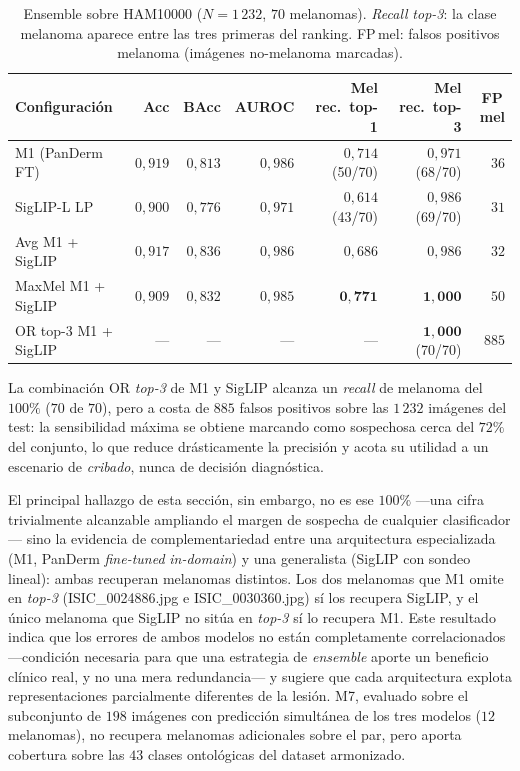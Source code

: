 \begin{table}[H]
\centering
\footnotesize
\setlength{\tabcolsep}{4pt}
\renewcommand{\arraystretch}{0.95}
\caption{Ensemble sobre HAM10000 ($N = 1\,232$, $70$ melanomas).
\emph{Recall} \emph{top-3}: la clase melanoma aparece entre las
tres primeras del ranking. FP\,mel: falsos positivos melanoma
(imágenes no-melanoma marcadas).}
\label{tab:ensemble}
\begin{tabular}{lrrrrrr}
\hline
Configuración                   & Acc           & BAcc          & AUROC         & Mel rec.\ top-1 & Mel rec.\ top-3 & FP\,mel \\
\hline
M1 (PanDerm FT)                 & $0{,}919$     & $0{,}813$     & $0{,}986$     & $0{,}714$ (50/70) & $0{,}971$ (68/70) & $36$ \\
SigLIP-L LP                     & $0{,}900$     & $0{,}776$     & $0{,}971$     & $0{,}614$ (43/70) & $0{,}986$ (69/70) & $31$ \\
Avg M1 + SigLIP                 & $0{,}917$     & $0{,}836$     & $0{,}986$     & $0{,}686$         & $0{,}986$         & $32$ \\
MaxMel M1 + SigLIP              & $0{,}909$     & $0{,}832$     & $0{,}985$     & $\mathbf{0{,}771}$ & $\mathbf{1{,}000}$ & $50$ \\
OR top-3 M1 + SigLIP            & ---           & ---           & ---           & ---               & $\mathbf{1{,}000}$ (70/70) & $885$ \\
\hline
\end{tabular}
\end{table}

La combinación OR \emph{top-3} de M1 y SigLIP alcanza un
\emph{recall} de melanoma del $100\%$ ($70$ de $70$), pero a costa
de $885$ falsos positivos sobre las $1\,232$ imágenes del test: la
sensibilidad máxima se obtiene marcando como sospechosa cerca del
$72\%$ del conjunto, lo que reduce drásticamente la precisión y
acota su utilidad a un escenario de \emph{cribado}, nunca de
decisión diagnóstica.

El principal hallazgo de esta sección, sin embargo, no es ese
$100\%$ ---una cifra trivialmente alcanzable ampliando el margen de
sospecha de cualquier clasificador--- sino la evidencia de
complementariedad entre una arquitectura especializada (M1, PanDerm
\emph{fine-tuned} \emph{in-domain}) y una generalista (SigLIP con
sondeo lineal): ambas recuperan melanomas distintos. Los dos
melanomas que M1 omite en \emph{top-3} (ISIC\_0024886.jpg e
ISIC\_0030360.jpg) sí los recupera SigLIP, y el único melanoma que
SigLIP no sitúa en \emph{top-3} sí lo recupera M1. Este resultado
indica que los errores de ambos modelos no están completamente
correlacionados ---condición necesaria para que una estrategia de
\emph{ensemble} aporte un beneficio clínico real, y no una mera
redundancia--- y sugiere que cada arquitectura explota
representaciones parcialmente diferentes de la lesión. M7, evaluado
sobre el subconjunto de $198$ imágenes con predicción simultánea de
los tres modelos ($12$ melanomas), no recupera melanomas adicionales
sobre el par, pero aporta cobertura sobre las $43$ clases
ontológicas del dataset armonizado.

